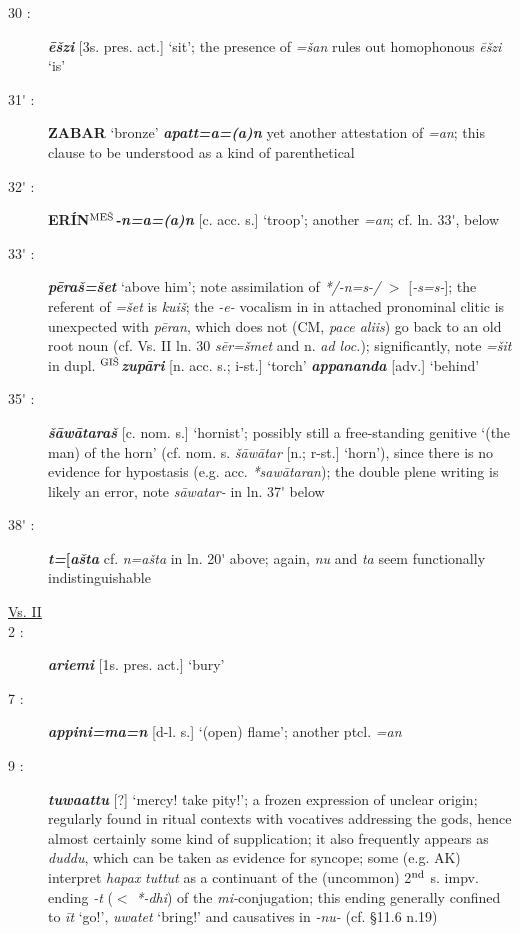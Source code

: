 \documentclass[10pt]{article}
\newcommand{\supersc}[1]{$^{\textrm{\scriptsize{#1}}}$}  	%
\newcommand{\bit}[1]{\textbf{\textit{#1}}}				%
\newcommand{\p}[1]{{\tiny[{#1}]}}					%
\newcommand{\pr}{\'{ }}									%
\newcommand{\hith}{\textsubwedge{h}}
\newcommand{\mpl}{\supersc{ME\v{S}}}
\newcommand{\wood}{\supersc{GI\v{S}}}
\renewcommand{\.}[1]{\textsubdot{#1}}
\begin{document}
\begin{description}
\item[30 :] \bit{\=e\v{s}zi} \p{3s. pres. act.} `sit'; the presence of \textit{=\v{s}an} rules out homophonous \textit{\=e\v{s}zi} `is'

\item[31{\pr} :] \textbf{ZABAR} `bronze' \bit{apatt=a=(a)n} yet another attestation of \textit{=an}; this clause to be understood as a kind of parenthetical

\item[32{\pr} :] \textbf{ER\'IN{\mpl}}\bit{-n=a=(a)n} \p{c. acc. s.} `troop'; another \textit{=an}; cf. ln. 33{\pr}, below

\item[33{\pr} :] \bit{p\=era\v{s}=\v{s}et} `above him'; note assimilation of \textit{*/-n=s-/} $>$ [{\it-s=s-}]; the referent of \textit{=\v{s}et} is \textit{kui\v{s}}; the \textit{-e-} vocalism in in attached pronominal clitic is unexpected with \textit{p\=eran}, which does not (CM, \textit{pace aliis}) go back to an old root noun (cf. Vs. II ln. 30 \textit{s\=er=\v{s}met} and n. \textit{ad loc.}); significantly, note \textit{=\v{s}it} in dupl. \textbf{\wood}\bit{zup\=ari} \p{n. acc. s.; i-st.} `torch' \bit{appananda} \p{adv.} `behind'

\item[35{\pr} :] \bit{\v{s}\=aw\=atara\v{s}} \p{c. nom. s.} `hornist'; possibly still a free-standing genitive `(the man) of the horn' (cf. nom. s. \textit{\v{s}\=aw\=atar} \p{n.; r-st.} `horn'), since there is no evidence for hypostasis (e.g. acc. \textit{*saw\=ataran}); the double plene writing is likely an error, note \textit{s\=awatar-} in ln. 37{\pr} below

\item[38{\pr} :] \bit{t=}\textbf{[}\bit{a\v{s}ta} cf. \textit{n=a\v{s}ta} in ln. 20{\pr} above; again, \textit{nu} and \textit{ta} seem functionally indistinguishable 


\item[\underline{Vs. II}]


\item[2 :] \bit{{\hith}ariemi} \p{1s. pres. act.} `bury'

\item[7 :] \bit{{\hith}appini=ma=n} \p{d-l. s.} `(open) flame'; another ptcl. \textit{=an}

\item[9 :] \bit{tuwaattu} \p{?} `mercy! take pity!'; a frozen expression of unclear origin; regularly found in ritual contexts with vocatives addressing the gods, hence almost certainly some kind of supplication; it also frequently appears as \textit{duddu}, which can be taken as evidence for syncope; some (e.g. AK) interpret \textit{hapax} \textit{tuttut} as a continuant of the (uncommon) 2\supersc{nd} s. impv. ending \textit{-t} ($<$ \textit{*-dhi}) of the \textit{mi-}conjugation; this ending generally confined to \textit{\=it} `go!', \textit{uwatet} `bring!' and causatives in \textit{-nu-} (cf.  \S11.6 n.19)


\end{description}
\end{document}
